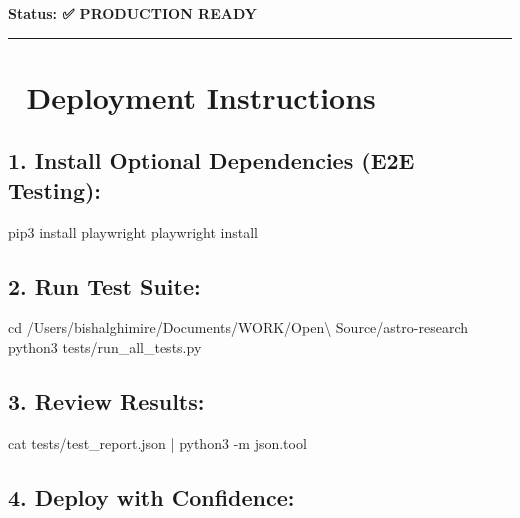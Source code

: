 \documentclass[
  11pt,
  oneside,
  openany]{scrbook}
\newenvironment{Shaded}{\begin{snugshade}}{\end{snugshade}}
\newcommand{\AttributeTok}[1]{\textcolor[rgb]{0.40,0.45,0.13}{#1}}
\newcommand{\BuiltInTok}[1]{\textcolor[rgb]{0.00,0.23,0.31}{#1}}
\newcommand{\ExtensionTok}[1]{\textcolor[rgb]{0.00,0.23,0.31}{#1}}
\newcommand{\FunctionTok}[1]{\textcolor[rgb]{0.28,0.35,0.67}{#1}}
\newcommand{\KeywordTok}[1]{\textcolor[rgb]{0.00,0.23,0.31}{#1}}
\newcommand{\NormalTok}[1]{\textcolor[rgb]{0.00,0.23,0.31}{#1}}
\begin{document}
\textbf{Status: ✅ PRODUCTION READY}

\begin{center}\rule{0.5\linewidth}{0.5pt}\end{center}

\section{🎯 Deployment Instructions}\label{deployment-instructions}

\subsection{1. Install Optional Dependencies (E2E
Testing):}\label{install-optional-dependencies-e2e-testing}

\begin{Shaded}
\begin{Highlighting}[]
\ExtensionTok{pip3}\NormalTok{ install playwright}
\ExtensionTok{playwright}\NormalTok{ install}
\end{Highlighting}
\end{Shaded}

\subsection{2. Run Test Suite:}\label{run-test-suite}

\begin{Shaded}
\begin{Highlighting}[]
\BuiltInTok{cd}\NormalTok{ /Users/bishalghimire/Documents/WORK/Open\textbackslash{} Source/astro{-}research}
\ExtensionTok{python3}\NormalTok{ tests/run\_all\_tests.py}
\end{Highlighting}
\end{Shaded}

\subsection{3. Review Results:}\label{review-results}

\begin{Shaded}
\begin{Highlighting}[]
\FunctionTok{cat}\NormalTok{ tests/test\_report.json }\KeywordTok{|} \ExtensionTok{python3} \AttributeTok{{-}m}\NormalTok{ json.tool}
\end{Highlighting}
\end{Shaded}

\subsection{4. Deploy with Confidence:}\label{deploy-with-confidence}
\end{document}
